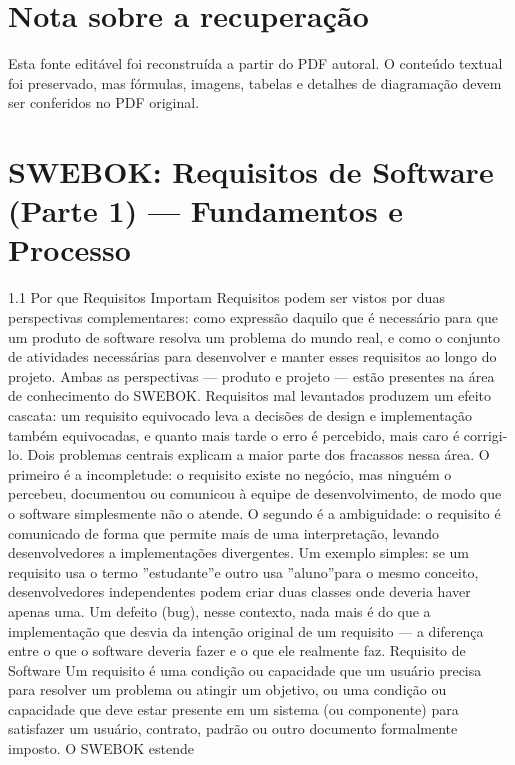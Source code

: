 \chapter*{Nota sobre a recuperação}


Esta fonte editável foi reconstruída a partir do PDF autoral. O conteúdo textual foi preservado, mas fórmulas, imagens, tabelas e detalhes de diagramação devem ser conferidos no PDF original.

\chapter{SWEBOK: Requisitos de Software (Parte 1) — Fundamentos e Processo}

1.1 Por que Requisitos Importam Requisitos podem ser vistos por duas perspectivas complementares: como expressão daquilo que é necessário para que um produto de software resolva um problema do mundo real, e como o conjunto de atividades necessárias para desenvolver e manter esses requisitos ao longo do projeto. Ambas as perspectivas — produto e projeto — estão presentes na área de conhecimento do SWEBOK. Requisitos mal levantados produzem um efeito cascata: um requisito equivocado leva a decisões de design e implementação também equivocadas, e quanto mais tarde o erro é percebido, mais caro é corrigi-lo. Dois problemas centrais explicam a maior parte dos fracassos nessa área. O primeiro é a incompletude: o requisito existe no negócio, mas ninguém o percebeu, documentou ou comunicou à equipe de desenvolvimento, de modo que o software simplesmente não o atende. O segundo é a ambiguidade: o requisito é comunicado de forma que permite mais de uma interpretação, levando desenvolvedores a implementações divergentes. Um exemplo simples: se um requisito usa o termo ”estudante”e outro usa ”aluno”para o mesmo conceito, desenvolvedores independentes podem criar duas classes onde deveria haver apenas uma. Um defeito (bug), nesse contexto, nada mais é do que a implementação que desvia da intenção original de um requisito — a diferença entre o que o software deveria fazer e o que ele realmente faz. Requisito de Software Um requisito é uma condição ou capacidade que um usuário precisa para resolver um problema ou atingir um objetivo, ou uma condição ou capacidade que deve estar presente em um sistema (ou componente) para satisfazer um usuário, contrato, padrão ou outro documento formalmente imposto. O SWEBOK estende

